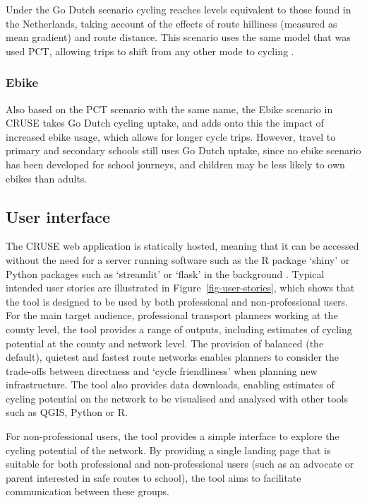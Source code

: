 \documentclass[
  super,
  preprint,
  3p]{elsarticle}
\begin{document}
Under the Go Dutch scenario cycling reaches levels equivalent to those
found in the Netherlands, taking account of the effects of route
hilliness (measured as mean gradient) and route distance. This scenario
uses the same model that was used PCT, allowing trips to shift from any
other mode to cycling \citep{lovelace2017}.

\subsubsection{Ebike}\label{ebike}

Also based on the PCT scenario with the same name, the Ebike scenario in
CRUSE takes Go Dutch cycling uptake, and adds onto this the impact of
increased ebike usage, which allows for longer cycle trips. However,
travel to primary and secondary schools still uses Go Dutch uptake,
since no ebike scenario has been developed for school journeys, and
children may be less likely to own ebikes than adults.

\subsection{User interface}\label{sec-ui}

The CRUSE web application is statically hosted, meaning that it can be
accessed without the need for a server running software such as the R
package `shiny' or Python packages such as `streamlit' or `flask' in the
background \citep{wickham2021}. Typical intended user stories are
illustrated in Figure~\ref{fig-user-stories}, which shows that the tool
is designed to be used by both professional and non-professional users.
For the main target audience, professional transport planners working at
the county level, the tool provides a range of outputs, including
estimates of cycling potential at the county and network level. The
provision of balanced (the default), quietest and fastest route networks
enables planners to consider the trade-offs between directness and
`cycle friendliness' when planning new infrastructure. The tool also
provides data downloads, enabling estimates of cycling potential on the
network to be visualised and analysed with other tools such as QGIS,
Python or R.

For non-professional users, the tool provides a simple interface to
explore the cycling potential of the network. By providing a single
landing page that is suitable for both professional and non-professional
users (such as an advocate or parent interested in safe routes to
school), the tool aims to facilitate communication between these groups.
\end{document}
